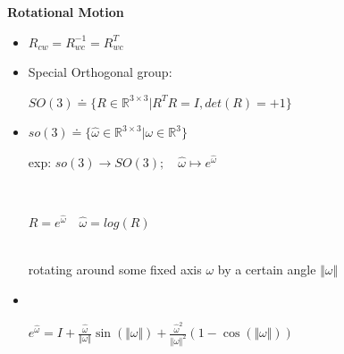 \documentclass{../cheat}
\begin{document}
\begin{multicols}{3}
	\textbf{Rotational Motion}
	\begin{itemize}
		\item {}$R_{cw}=R^{-1}_{wc}=R^{T}_{wc}$
		\item Special Orthogonal group:\\
			\centerline{$SO(3)\doteq\{R\in \mathbb{R}^{3\times3}| R^T R=I, det(R)=+1\}$}
		\item {} 
			$so(3)\doteq \{ \widehat{\omega}\in \mathbb{R}^{3\times3}| \omega \in \mathbb{R}^3 \}$\\
			\centerline{exp: $so(3) \rightarrow SO(3); \quad \widehat{\omega} \mapsto e^{\widehat{\omega}}$}\\
			\centerline{$R=e^{\widehat{\omega}} \quad \widehat{\omega}=log(R)$}\\
			rotating around some fixed axis $\omega$ by a certain angle $\Vert{\omega}\Vert$
		\item {}\\
			\centerline{$e^{\widehat{\omega}} = I + \frac{\widehat{\omega}}{\Vert{\omega}\Vert} \sin(\Vert{\omega}\Vert) + \frac{\widehat{\omega}^2}{\Vert{\omega}\Vert^2} (1-\cos(\Vert{\omega}\Vert))$}
	\end{itemize}
	

\end{multicols}
\end{document}
